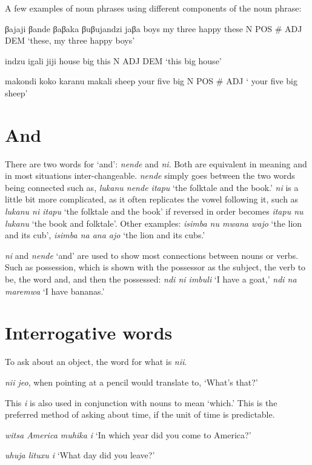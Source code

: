 A few examples of noun phrases using different components of the noun phrase:
\begin{wrdex}
\item \glll βajaji βand\ezh{}e βaβaka βuβujandzi jaβa
boys my three happy these
N POS \# ADJ DEM
\glt `these, my three happy boys'
\glend
\item \glll indzu i\engma{}gali jiji
house big this
N ADJ DEM
\glt `this big house'
\glend
\item \glll makondi koko karanu makali
sheep your five big
N POS \# ADJ
\glt ` your five big sheep'
\glend
\end{wrdex}

\section{And}
There are two words for `and': \emph{nende} and \emph{ni}.  Both are equivalent in meaning and in most situations inter-changeable.  \emph{nende} simply goes between the two words being connected such as, \emph{lukanu nende \esh{}itapu} `the folktale and the book.'  \emph{ni} is a little bit more complicated, as it often replicates the vowel following it, such as \emph{lukanu ni \esh{}itapu} `the folktale and the book' if reversed in order becomes \emph{\esh{}itapu nu lukanu} `the book and folktale'.  Other examples: \emph{isimba nu mwana wajo} `the lion and its cub', \emph{isimba na \beta{}ana \beta{}ajo} `the lion and its cubs.'

\emph{ni} and \emph{nende} `and' are used to show most connections between nouns or verbs.  Such as possession, which is shown with the possessor as the subject, the verb to be, the word and, and then the possessed: \emph{ndi ni imbuli} `I have a goat,' \emph{ndi na maremwa} `I have bananas.'

\section{Interrogative words}
To ask about an object, the word for what is \emph{ni\esh{}i}.
\begin{wrdex} \item \emph{ni\esh{}i je\esh{}o}, when pointing at a pencil would translate to, `What's that?' \end{wrdex}

This \emph{\esh{}i} is also used in conjunction with nouns to mean `which.'  This is the preferred method of asking about time, if the unit of time is predictable.
\begin{wrdex} \item \emph{witsa America muhika \esh{}i} `In which year did you come to America?'
\item \emph{uhuja lituxu \esh{}i} `What day did you leave?' \end{wrdex}

